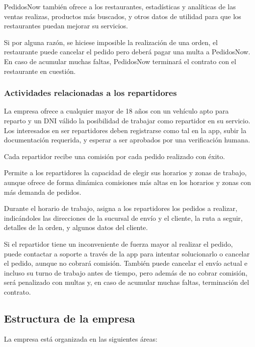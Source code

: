 PedidosNow también ofrece a los restaurantes, estadísticas y analíticas de las ventas realizas, productos más buscados, y otros datos de utilidad para que los restaurantes puedan mejorar su servicios.

Si por alguna razón, se hiciese imposible la realización de una orden, el restaurante puede cancelar el pedido pero deberá pagar una multa a PedidosNow. En caso de acumular muchas faltas, PedidosNow terminará el contrato con el restaurante en cuestión.

\subsubsection{Actividades relacionadas a los repartidores}

La empresa ofrece a cualquier mayor de 18 años con un vehículo apto para reparto y un DNI válido la posibilidad de trabajar como repartidor en su servicio. Los interesados en ser repartidores deben registrarse como tal en la app, subir la documentación requerida, y esperar a ser aprobados por una verificación humana.

Cada repartidor recibe una comisión por cada pedido realizado con éxito.

Permite a los repartidores la capacidad de elegir sus horarios y zonas de trabajo, aunque ofrece de forma dinámica comisiones más altas en los horarios y zonas con más demanda de pedidos.

Durante el horario de trabajo, asigna a los repartidores los pedidos a realizar, indicándoles las direcciones de la sucursal de envío y el cliente, la ruta a seguir, detalles de la orden, y algunos datos del cliente.

Si el repartidor tiene un inconveniente de fuerza mayor al realizar el pedido, puede contactar a soporte a través de la app para intentar solucionarlo o cancelar el pedido, aunque no cobrará comisión. También puede cancelar el envío actual e incluso su turno de trabajo antes de tiempo, pero además de no cobrar comisión, será penalizado con multas y, en caso de acumular muchas faltas, terminación del contrato.


\subsection{Estructura de la empresa}

La empresa está organizada en las siguientes áreas:


